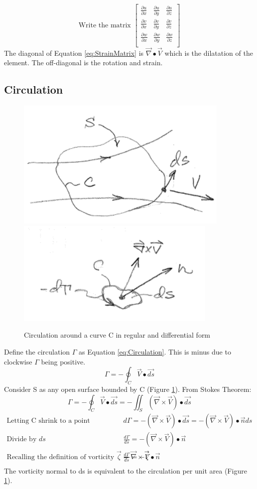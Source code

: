 \documentclass[draft=false, titlepage]{article}
\newcommand{\gradient}{\vec{\nabla}}
\newcommand{\partialfrac}[2]{\frac{\partial #1}{\partial #2}}
\begin{document}
\begin{equation}
    \text{Write the matrix } \begin{bmatrix}
    \partialfrac{u}{x} & \partialfrac{u}{y} & \partialfrac{u}{z}\\
    \partialfrac{v}{x} & \partialfrac{v}{y} & \partialfrac{v}{z}\\
    \partialfrac{w}{x} & \partialfrac{w}{y} & \partialfrac{w}{z}\\
    \end{bmatrix}
    \label{eq:StrainMatrix}
\end{equation}
The diagonal of Equation \ref{eq:StrainMatrix} is $\gradient \bullet \vec{V}$ which is the dilatation of the element. The off-diagonal is the rotation and strain.

\subsection{Circulation}
\begin{figure}[ht]
    \centering
    \includegraphics[width=0.3\linewidth]{Figures/circulation.PNG}
    \includegraphics[width=0.3\linewidth]{Figures/circulation2.PNG}
    \caption{Circulation around a curve C in regular and differential form}
    \label{fig:Circulation}
\end{figure}

Define the circulation $\Gamma$ as Equation \ref{eq:Circulation}. This is minus due to clockwise $\Gamma$ being positive. 
\begin{equation}
    \Gamma = -\oint_C \vec{V} \bullet \vec{ds}
    \label{eq:Circulation}
\end{equation}
Consider S as any open surface bounded by C (Figure \ref{fig:Circulation}). From Stokes Theorem:
\begin{equation*}
    \Gamma = -\oint_C \vec{V} \bullet \vec{ds} = -\iint_S (\gradient \times \vec{V}) \bullet \vec{ds}
\end{equation*}
\begin{align*}
    \text{Letting C shrink to a point}\quad & d\Gamma = -(\gradient \times \vec{V}) \bullet \vec{ds} = -(\gradient \times \vec{V})\bullet \vec{n}ds\\
    \text{Divide by } ds \quad & \frac{d\Gamma}{ds} = -(\gradient \times \vec{V})\bullet \vec{n}\\
    \text{Recalling the definition of vorticity } \vec{\zeta} = \gradient \times \vec{V} \quad &
    \frac{d\Gamma}{ds} = -\vec{\zeta} \bullet \vec{n}\\
\end{align*}
The vorticity normal to ds is equivalent to the circulation per unit area (Figure \ref{fig:Circulation}).
\end{document}

